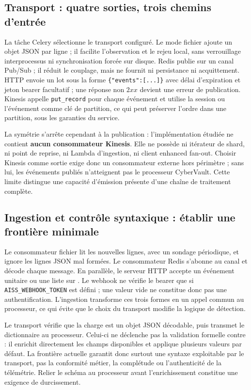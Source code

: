 \documentclass[11pt,a4paper,oneside]{report}
\theoremstyle{definition}
\theoremstyle{plain}
\begin{document}
\subsection{Transport : quatre sorties, trois chemins d'entrée}

La tâche Celery sélectionne le transport configuré. Le mode fichier ajoute un
objet JSON par ligne ; il facilite l'observation et le rejeu local, sans
verrouillage interprocessus ni synchronisation forcée sur disque. Redis publie
sur un canal Pub/Sub ; il réduit le couplage, mais ne fournit ni persistance ni
acquittement. HTTP envoie un lot sous la forme
\texttt{\{"events":[...]\}} avec délai d'expiration et jeton bearer
facultatif ; une réponse non \(2xx\) devient une erreur de publication.
Kinesis appelle \texttt{put\_record} pour chaque événement et utilise la
session ou l'événement comme clé de partition, ce qui peut préserver l'ordre
dans une partition, sous les garanties du service.

La symétrie s'arrête cependant à la publication : l'implémentation étudiée ne
contient \textbf{aucun consommateur Kinesis}. Elle ne possède ni itérateur de
shard, ni point de reprise, ni Lambda d'ingestion, ni client enhanced fan-out.
Choisir Kinesis comme sortie exige donc un consommateur externe hors
périmètre ; sans lui, les événements publiés n'atteignent pas le processeur
CyberVault. Cette limite distingue une capacité d'émission présente d'une
chaîne de traitement complète.

\subsection{Ingestion et contrôle syntaxique : établir une frontière minimale}

Le consommateur fichier lit les nouvelles lignes, avec un sondage périodique,
et ignore les lignes JSON mal formées. Le consommateur Redis s'abonne au canal
et décode chaque message. En parallèle, le serveur HTTP accepte un événement
unitaire ou une liste sur . Le webhook ne vérifie le bearer que
si \texttt{AISS\_WEBHOOK\_TOKEN} est défini ; une valeur vide ne constitue
donc pas une authentification. L'ingestion transforme ces trois formes en un
appel commun au processeur, ce qui évite que le choix du transport modifie la
logique de détection.

Le transport vérifie que la charge est un objet JSON décodable, puis transmet
le dictionnaire au processeur. Celui-ci ne déclenche pas la validation formelle
contre  : il enrichit directement les champs
disponibles et applique plusieurs valeurs par défaut. La frontière actuelle
garantit donc surtout une syntaxe exploitable par le transport, pas la
conformité métier, la complétude ou l'authenticité de la télémétrie. Relier le
schéma au processeur avant l'enrichissement constitue une exigence de
durcissement.
\end{document}
